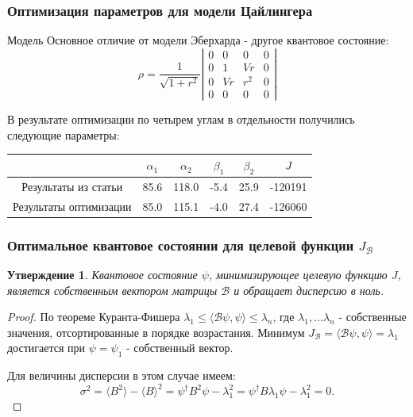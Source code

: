 \documentclass[11pt,pdf,hyperref={unicode}]{beamer}
\newtheorem{mytheorem}{Утверждение}
\theoremstyle{definition}
\begin{document}
\begin{frame}
\frametitle{Оптимизация параметров для модели Цайлингера}
\begin{block}{Модель}
Основное отличие от модели Эберхарда - другое квантовое состояние:
\[
\rho = \frac{1}{\sqrt{1+r^2}}\left|
\begin{smallmatrix}
0 & 0 & 0 & 0\\
0 & 1 & Vr & 0\\
0 & Vr & r^2 & 0\\
0 & 0 & 0 & 0
\end{smallmatrix}\right|
\]
\end{block}

В результате оптимизации по четырем углам в отдельности получились следующие параметры:

\begin{tabular}{|c|c|c|c|c|c|}
\hline 
 & $\alpha_1$ & $\alpha_2$ & $\beta_1$ & $\beta_2$ & $J$ \\ 
\hline 
Результаты из статьи & 85.6 & 118.0 & -5.4 & 25.9 & -120191 \\ 
\hline 
Результаты оптимизации & 85.0 & 115.1 & -4.0 & 27.4 & -126060 \\ 
\hline 
\end{tabular}
\end{frame}

\begin{frame}
\frametitle{Оптимальное квантовое состоянии для целевой функции $J_\mathcal{B}$}
\begin{mytheorem}
Квантовое состояние $\psi$, минимизирующее целевую функцию $J$, является собственным вектором матрицы $\mathcal{B}$ и обращает дисперсию в ноль.
\end{mytheorem}
\begin{proof}
По теореме Куранта-Фишера $\lambda_1 \leq \langle\mathcal{B}\psi, \psi\rangle \leq \lambda_n$, где $\lambda_1, \ldots \lambda_n$ - собственные значения, отсортированные в порядке возрастания. Минимум $J_\mathcal{B} = \langle\mathcal{B}\psi, \psi\rangle = \lambda_1$ достигается при $\psi = \psi_1$ - собственный вектор. 

Для величины дисперсии в этом случае имеем:
\[\sigma^2 = \langle B^2\rangle - \langle B\rangle^2 = \psi^\dagger B^2 \psi - \lambda_1^2 = \psi^\dagger B \lambda_1  \psi - \lambda_1^2 = 0.
\]

\end{proof}
\end{frame}
\end{document}
